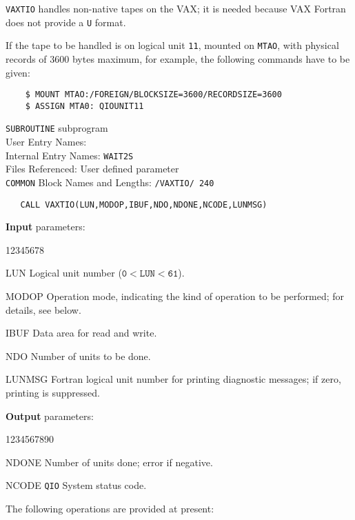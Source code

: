                            
             
\Submitter{}                                
{\tt VAXTIO} handles non-native tapes on the VAX; it is needed
because VAX Fortran does not provide a {\tt U} format.
\par
If the tape to be handled is on logical unit {\tt 11}, mounted on
{\tt MTAO}, with physical records of 3600 bytes maximum, for example, the
following commands have to be given:
\begin{verbatim}
    $ MOUNT MTAO:/FOREIGN/BLOCKSIZE=3600/RECORDSIZE=3600
    $ ASSIGN MTA0: QIOUNIT11
\end{verbatim}
\Structure
{\tt SUBROUTINE} subprogram \\
User Entry Names: \\
Internal Entry Names: {\tt WAIT2S} \\
Files Referenced: User defined parameter\\
{\tt COMMON} Block Names and Lengths: {\tt /VAXTIO/ 240}
\Usage
\begin{verbatim}
   CALL VAXTIO(LUN,MODOP,IBUF,NDO,NDONE,NCODE,LUNMSG)
\end{verbatim}
{\bf Input} parameters:
\begin{DLtt}{12345678}
\item [LUN] Logical unit number ($\mathtt{0 < LUN < 61}$).
\item [MODOP] Operation mode, indicating the kind of operation to be
performed; for details, see below.
\item [IBUF] Data area for read and write.
\item [NDO] Number of units to be done.
\item [LUNMSG] Fortran logical unit number for printing
diagnostic messages; if zero, printing is suppressed.
\end{DLtt}
{\bf Output} parameters:
\begin{DLtt}{1234567890}
\item [NDONE] Number of units done; error if negative.
\item [NCODE] {\tt QIO} System status code.
\end{DLtt}
The following operations are provided at present: \\[2mm]
